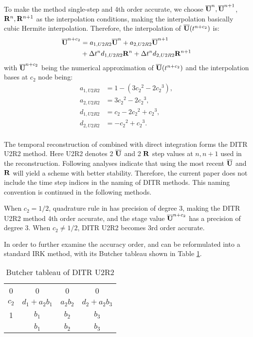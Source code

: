 To make the method single-step and 4th order accurate,
we choose $\overline{\mathbf{U}}^{n},\overline{\mathbf{U}}^{n+1}$, $\mathbf{R}^{n},\mathbf{R}^{n+1}$ as
the interpolation conditions, making the interpolation
basically cubic Hermite interpolation.
Therefore, the interpolation of $\overline{\mathbf{U}}(t^{n+c_2})$
is:
\begin{equation}
    \begin{aligned}
        \label{eq:TRU2R2}
        \overline{\mathbf{U}}^{n+c_2} & =
        a_{1,U2R2}\overline{\mathbf{U}}^{n} +
        a_{2,U2R2}\overline{\mathbf{U}}^{n + 1}
        \\ & +
        {\Delta} t^n d_{1,U2R2}\mathbf{R}^{n} +
        {\Delta} t^n d_{2,U2R2}\mathbf{R}^{n + 1}
    \end{aligned}
\end{equation}
with $\overline{\mathbf{U}}^{n+c_2}$ being
the numerical approximation
of $\overline{\mathbf{U}}(t^{n+c_2})$
and the interpolation bases at $c_2$ node being:
\begin{equation}
    \begin{aligned}
        a_{1,U2R2} & = 1 - (3{c_2}^2 - 2 {c_2}^3) , \\
        a_{2,U2R2} & = 3{c_2}^2 - 2 {c_2}^3 ,       \\
        d_{1,U2R2} & = {c_2} - 2 {c_2}^2 + {c_2}^3, \\
        d_{2,U2R2} & = - {c_2}^2 + {c_2}^3 .        \\
    \end{aligned}
    \label{eq:interpU2R2}
\end{equation}

The temporal reconstruction of 
combined with direct integration 
forms the DITR U2R2 method.
Here U2R2 denotes 2 $\overline{\mathbf{U}}$ and 2 $\mathbf{R}$
step values at $n,n+1$ used in the reconstruction.
Following analyses indicate that using
the most recent $\overline{\mathbf{U}}$ and $\mathbf{R}$
will yield a scheme with better stability.
Therefore, the current paper does not include the
time step indices in the naming of DITR methods.
This naming convention is continued in the following
methods.

When $c_2=1/2$, quadrature rule in   has precision
of degree 3, making the DITR U2R2 method 4th order accurate,
and the stage value $\overline{\mathbf{U}}^{n+c_2}$ has a precision of degree 3.
When $c_2\neq1/2$, DITR U2R2 becomes 3rd order accurate.

In order to further examine the accuracy order,
 and 
can be reformulated into a standard IRK method,
with its Butcher tableau shown in Table \ref{tab:U2R2Butcher}.
\begin{table}[htbp]
    \centering
    \begin{tabular}{c|ccc}
        0     & 0              & 0        & 0              \\
        $c_2$ & $d_1 + a_2b_1$ & $a_2b_2$ & $d_2 + a_2b_3$ \\
        1     & $b_1$          & $b_2$    & $b_3$          \\ \hline
              & $b_1$          & $b_2$    & $b_3$
    \end{tabular}
    \caption{Butcher tableau of DITR U2R2}
    \label{tab:U2R2Butcher}
\end{table}

